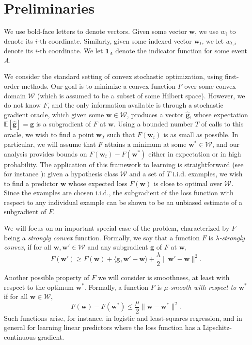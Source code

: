 \documentclass{article}
\newcommand{\E}{\mathbb{E}}
\newcommand{\bw}{\mathbf{w}}
\newcommand{\bg}{\mathbf{g}}
\newcommand{\Wcal}{\mathcal{W}}
\newcommand{\norm}[1]{\|#1\|}
\newcommand{\inner}[1]{\langle#1\rangle}
\begin{document}
\section{Preliminaries}\label{sec:prelim}

We use bold-face letters to denote vectors. Given some vector $\bw$, we use $w_i$ to denote its $i$-th coordinate. Similarly, given some indexed vector $\bw_t$, we let $w_{t,i}$ denote its $i$-th coordinate. We let $\mathbf{1}_{A}$ denote the indicator function for some event $A$.

We consider the standard setting of convex stochastic optimization, using first-order methods. Our goal is to minimize a convex function $F$ over some convex domain $\Wcal$ (which is assumed to be a subset of some Hilbert space). However, we do not know $F$, and the only information available is through a stochastic gradient oracle, which given some $\bw\in\Wcal$, produces a vector $\hat{\bg}$, whose expectation $\E[\hat{\bg}]=\bg$ is a subgradient of $F$ at $\bw$. Using a bounded number $T$ of calls to this oracle, we wish to find a point $\bw_T$ such that $F(\bw_t)$ is as small as possible. In particular, we will assume that $F$ attains a minimum at some $\bw^{*}\in\Wcal$, and our analysis provides bounds on $F(\bw_t)-F(\bw^{*})$ either in expectation or in high probability. The application of this framework to learning is straightforward (see for instance \cite{ShalShamSrebSri09b}): given a hypothesis class $\Wcal$ and a set of $T$ i.i.d. examples, we wish to find a predictor $\bw$ whose expected loss $F(\bw)$ is close to optimal over $\Wcal$. Since the examples are chosen i.i.d., the subgradient of the loss function with respect to any individual example can be shown to be an unbiased estimate of a subgradient of $F$.

We will focus on an important special case of the problem, characterized by $F$ being a \emph{strongly convex} function. Formally, we say that a function $F$ is \emph{$\lambda$-strongly convex}, if for all $\bw,\bw'\in \Wcal$ and any subgradient $\bg$ of $F$ at $\bw$,
\begin{equation}\label{eq:strconvex}
F(\bw')\geq F(\bw)+\inner{\bg,\bw'-\bw}+\frac{\lambda}{2}\norm{\bw'-\bw}^2.
\end{equation}

Another possible property of $F$ we will consider is smoothness, at least with respect to the optimum $\bw^*$. Formally, a function $F$ is \emph{$\mu$-smooth with respect to $\bw^*$} if for all $\bw\in\Wcal$,
\begin{equation}\label{eq:smoothness}
F(\bw) - F(\bw^*)\leq \frac{\mu}{2}\norm{\bw-\bw^*}^2.
\end{equation}
Such functions arise, for instance, in logistic and least-squares regression, and in general for learning linear predictors where the loss function has a Lipschitz-continuous gradient.
\end{document}
